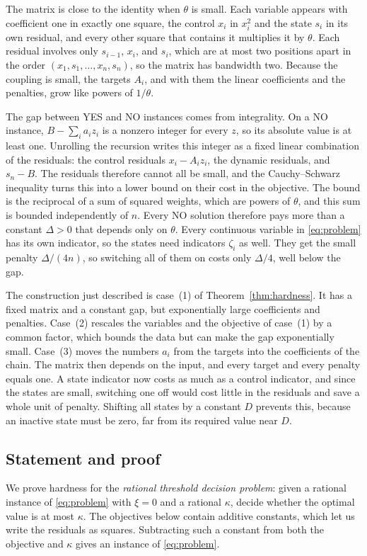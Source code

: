 The matrix is close to the identity when $\theta$ is small. Each
variable appears with coefficient one in exactly one square, the control
$x_i$ in $x_i^2$ and the state $s_i$ in its own residual, and every other
square that contains it multiplies it by $\theta$. Each residual involves
only $s_{i-1}$, $x_i$, and $s_i$, which are at most two positions apart
in the order $(x_1,s_1,\ldots,x_n,s_n)$, so the matrix has bandwidth
two. Because the coupling is small, the targets $A_i$, and with them
the linear coefficients and the penalties, grow like powers of
$1/\theta$.

The gap between YES and NO instances comes from integrality. On a NO
instance, $B-\sum_ia_iz_i$ is a nonzero integer for every $z$, so its
absolute value is at least one. Unrolling the recursion writes this
integer as a fixed linear combination of the residuals: the control
residuals $x_i-A_iz_i$, the dynamic residuals, and $s_n-B$. The
residuals therefore cannot all be small, and the Cauchy--Schwarz
inequality turns this into a lower bound on their cost in the objective.
The bound is the reciprocal of a sum of squared weights, which are powers
of $\theta$, and this sum is bounded independently of $n$. Every NO
solution therefore pays more than a constant $\Delta>0$ that depends
only on $\theta$. Every continuous variable in \eqref{eq:problem} has
its own indicator, so the states need indicators $\zeta_i$ as well.
They get the small penalty $\Delta/(4n)$, so switching all of them on
costs only $\Delta/4$, well below the gap.

The construction just described is case~(1) of
Theorem~\ref{thm:hardness}. It has a fixed matrix and a constant gap,
but exponentially large coefficients and penalties. Case~(2) rescales
the variables and the objective of case~(1) by a common factor, which
bounds the data but can make the gap exponentially small. Case~(3)
moves the numbers $a_i$ from the targets into the coefficients of the
chain. The matrix then depends on the input, and every target and every
penalty equals one. A state indicator now costs as much as a control
indicator, and since the states are small, switching one off would cost
little in the residuals and save a whole unit of penalty. Shifting all
states by a constant $D$ prevents this, because an inactive state must
be zero, far from its required value near $D$.

\subsection{Statement and proof}
We prove hardness for the \emph{rational threshold decision problem}:
given a rational instance of \eqref{eq:problem} with $\xi=0$ and a
rational $\kappa$, decide whether the optimal value is at most $\kappa$.
The objectives below contain additive constants, which let us write the
residuals as squares. Subtracting such a constant from both the
objective and $\kappa$ gives an instance of \eqref{eq:problem}.

